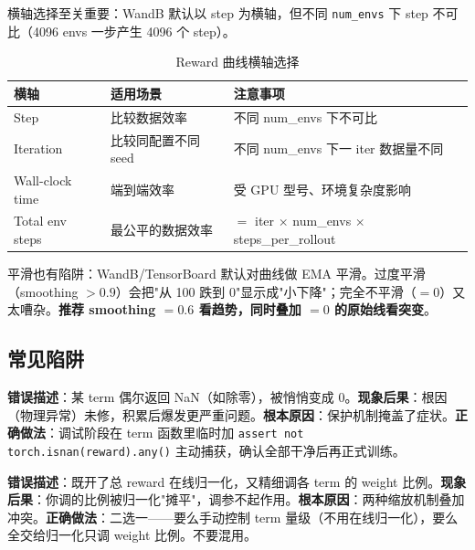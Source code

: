 横轴选择至关重要：WandB 默认以 step 为横轴，但不同 \verb|num_envs| 下 step 不可比（4096 envs 一步产生 4096 个 step）。

\begin{table}[H]
\centering
\caption{Reward 曲线横轴选择}
\label{tab:rlmc-diag-xaxis}
\begin{tabular}{p{3.4cm}p{4.0cm}p{5.0cm}}
\hline
横轴 & 适用场景 & 注意事项 \\
\hline
Step & 比较数据效率 & 不同 num\_envs 下不可比 \\
Iteration & 比较同配置不同 seed & 不同 num\_envs 下一 iter 数据量不同 \\
Wall-clock time & 端到端效率 & 受 GPU 型号、环境复杂度影响 \\
Total env steps & 最公平的数据效率 & $=$ iter $\times$ num\_envs $\times$ steps\_per\_rollout \\
\hline
\end{tabular}
\end{table}

平滑也有陷阱：WandB/TensorBoard 默认对曲线做 EMA 平滑。过度平滑（smoothing $>0.9$）会把"从 100 跌到 0"显示成"小下降"；完全不平滑（$=0$）又太嘈杂。\textbf{推荐 smoothing $=0.6$ 看趋势，同时叠加 $=0$ 的原始线看突变}。

\subsection{常见陷阱}

\begin{pitfall}
\textbf{错误描述}：某 term 偶尔返回 NaN（如除零），被悄悄变成 0。\textbf{现象后果}：根因（物理异常）未修，积累后爆发更严重问题。\textbf{根本原因}：保护机制掩盖了症状。\textbf{正确做法}：调试阶段在 term 函数里临时加 \verb|assert not torch.isnan(reward).any()| 主动捕获，确认全部干净后再正式训练。
\end{pitfall}

\begin{pitfall}
\textbf{错误描述}：既开了总 reward 在线归一化，又精细调各 term 的 weight 比例。\textbf{现象后果}：你调的比例被归一化"摊平"，调参不起作用。\textbf{根本原因}：两种缩放机制叠加冲突。\textbf{正确做法}：二选一——要么手动控制 term 量级（不用在线归一化），要么全交给归一化只调 weight 比例。不要混用。
\end{pitfall}


